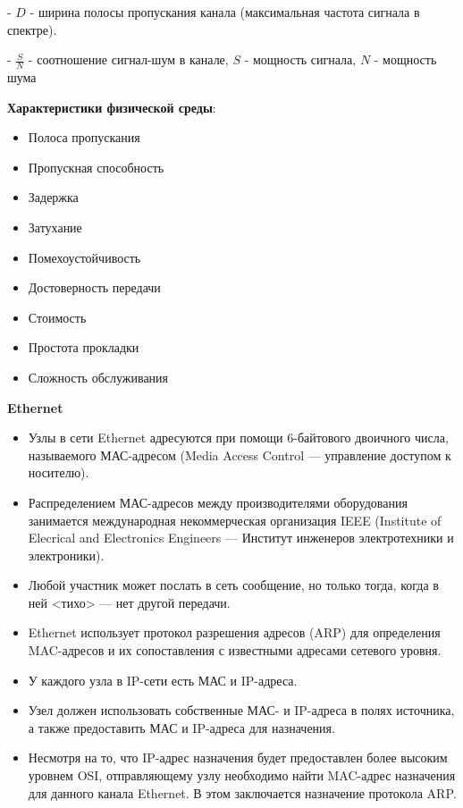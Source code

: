 - $D$ - ширина полосы пропускания канала (максимальная частота сигнала в спектре).

- $\frac{S}{N}$ - соотношение сигнал-шум в канале,  $S$ - мощность сигнала, $N$ - мощность шума
    
\textbf{Характеристики физической среды}:    
\begin{itemize}
    \item Полоса пропускания
    \item Пропускная способность
    \item Задержка
    \item Затухание
    \item Помехоустойчивость
    \item Достоверность передачи
    \item Стоимость
    \item Простота прокладки
    \item Сложность обслуживания
\end{itemize}


\textbf{\textbf{Ethernet}}

\begin{itemize}
    \item Узлы в сети Ethernet адресуются при помощи 6-байтового двоичного числа, называемого МАС-адресом (Media Access Control — управление доступом к носителю).
    \item Распределением МАС-адресов между производителями оборудования занимается международная некоммерческая организация IEEE (Institute of Elecrical and Electronics Engineers — Институт инженеров электротехники и электроники).
    \item Любой участник может послать в сеть сообщение, но только тогда, когда в ней <тихо> --- нет другой передачи.
    \item Ethernet использует протокол разрешения адресов (ARP) для определения MAC-адресов и их сопоставления с известными адресами сетевого уровня. 
    \item У каждого узла в IP-сети есть МАС и IP-адреса. 
    \item Узел должен использовать собственные МАС- и IP-адреса в полях источника, а также предоставить МАС и IP-адреса для назначения. 
   \item  Несмотря на то, что IP-адрес назначения будет предоставлен более высоким уровнем OSI, отправляющему узлу необходимо найти MAC-адрес назначения для данного канала Ethernet. 
    В этом заключается назначение протокола ARP.
\end{itemize}

